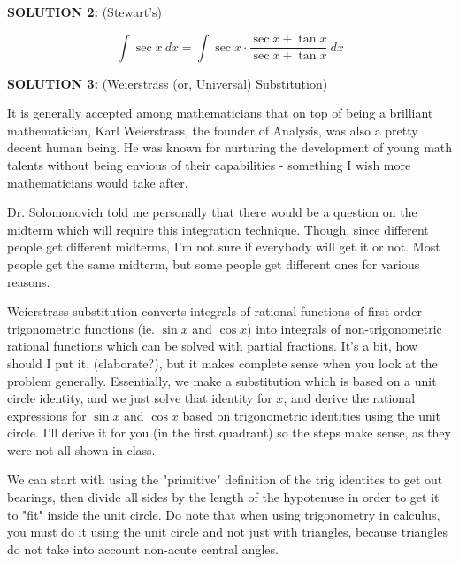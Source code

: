 \documentclass{article}
\begin{document}
\newpage

{\bf{}SOLUTION 2:} (Stewart's)

\[\int\sec x\ dx=\int\sec x\cdot\frac{\sec x+\tan x}{\sec x+\tan x}\ dx\]

\vspace{10pt}

{\bf{}SOLUTION 3:} (Weierstrass (or, Universal) Substitution)

\vspace{10pt}

It is generally accepted among mathematicians that on top of being a brilliant mathematician, Karl Weierstrass, the founder of Analysis, was also a pretty decent human being. He was known for nurturing the development of young math talents without being envious of their capabilities - something I wish more mathematicians would take after. 

\vspace{10pt}

Dr. Solomonovich told me personally that there would be a question on the midterm which will require this integration technique. Though, since different people get different midterms, I'm not sure if everybody will get it or not. Most people get the same midterm, but some people get different ones for various reasons.

\vspace{10pt}

Weierstrass substitution converts integrals of rational functions of first-order trigonometric functions (ie. $\sin x$ and $\cos x$) into integrals of non-trigonometric rational functions which can be solved with partial fractions. It's a bit, how should I put it, (elaborate?), but it makes complete sense when you look at the problem generally. Essentially, we make a substitution which is based on a unit circle identity, and we just solve that identity for $x$, and derive the rational expressions for $\sin x$ and $\cos x$ based on trigonometric identities using the unit circle. I'll derive it for you (in the first quadrant) so the steps make sense, as they were not all shown in class.

\vspace{10pt}

We can start with using the "primitive" definition of the trig identites to get out bearings, then divide all sides by the length of the hypotenuse in order to get it to "fit" inside the unit circle. Do note that when using trigonometry in calculus, you must do it using the unit circle and not just with triangles, because triangles do not take into account non-acute central angles.
\end{document}
